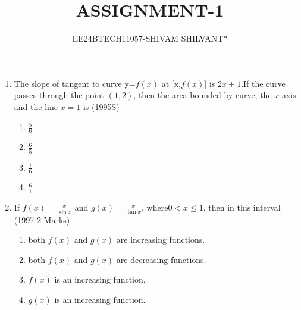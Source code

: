 \documentclass[journal,12pt,twocolumn]{IEEEtran}
\theoremstyle{remark}
\begin{document}

\vspace{3cm}

\title{ASSIGNMENT-1}
\author{EE24BTECH11057-SHIVAM SHILVANT*}
\maketitle
\newpage
\bigskip

\renewcommand{\thefigure}{\theenumi}
\renewcommand{\thetable}{\theenumi}
\begin{enumerate}[start=9]
\item The slope of tangent to curve y=$f(x)$ at [x,$f(x)$] is $2x + 1$.If the curve passes through the point $(1,2)$, then the area bounded by curve, the $x$ axis and the line $x=1$ is
\hfill {(1995S) }
\begin{enumerate}
    \item $\displaystyle\frac{5}{6}$\\ 
    \item $\displaystyle\frac{6}{5}$\\
    \item $\displaystyle\frac{1}{6}$\\ 
    \item $\displaystyle\frac{6}{1}$\\
\end{enumerate}
\item If $f(x)=\displaystyle\frac{x}{\sin x}$ and $g(x)=\displaystyle\frac{x}{\tan x}$, where$0<x\leq1$, then in this interval
\hfill (1997-2 Marks)
\begin{enumerate}
    \item both $f(x)$ and $g(x)$ are increasing functions.
\item both $f(x)$ and $g(x)$ are decreasing functions.
    \item $f(x)$ is an increasing function.
    \item $g(x)$ is an increasing function.\\
\end{enumerate}


\end{enumerate}
\end{document}
